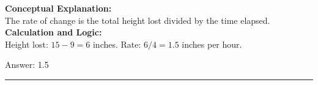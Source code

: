 \documentclass[11pt,paper=a4,answers]{exam}
\begin{document}
\begin{questions}
\begin{solution}
\textbf{Conceptual Explanation:} \\
The rate of change is the total height lost divided by the time elapsed.
\\[10pt]
\textbf{Calculation and Logic:} \\
Height lost: $15 - 9 = 6$ inches.
Rate: $6 / 4 = 1.5$ inches per hour.

\vspace{15pt}
Answer: \colorbox{yellow!100}{1.5}
\end{solution}


\end{questions}
\begin{center}
\rule{.5\textwidth}{1pt}
\end{center}
\end{document}
